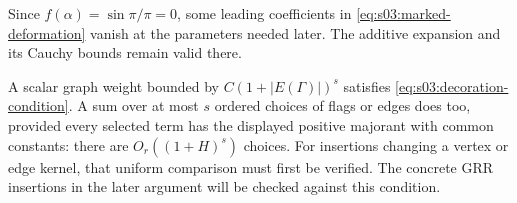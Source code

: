 \begin{rmk}
Since $f(\alpha)=\sin\pi/\pi=0$, some leading coefficients in
\eqref{eq:s03:marked-deformation} vanish at the parameters needed
later. The additive expansion and its Cauchy bounds remain valid
there.

A scalar graph weight bounded by $C(1+|E(\Gamma)|)^s$ satisfies
\eqref{eq:s03:decoration-condition}. A sum over at most $s$
ordered choices of flags or edges does too, provided every selected
term has the displayed positive majorant with common constants:
there are $O_r((1+H)^s)$ choices. For insertions changing a vertex
or edge kernel, that uniform comparison must first be verified.
The concrete GRR insertions in the later argument will be checked
against this condition.
\end{rmk}
